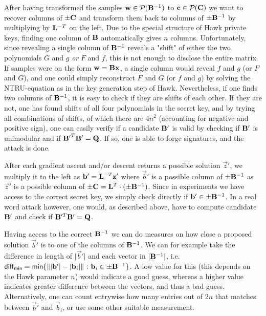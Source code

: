 After having transformed the samples $\mathbf{w} \in \mathcal{P}_{}(\mathbf{\mathbf{B}^{-1}})$ to $\mathbf{c} \in \mathcal{P}_{}(\mathbf{\mathbf{C}})$ we want to recover columns of $\pm \mathbf{C}$ and transform them back to columns of $\pm \mathbf{B}^{-1}$ by multiplying by $\mathbf{L}^{-T}$ on the left.
Due to the special structure of Hawk private keys, finding one column of $\mathbf{B}$ automatically gives $n$ columns.
Unfortunately, since revealing a single column of $ \mathbf{B}^{-1}$ reveals a "shift" of either the two polynomials $G$ and $ g$ \textit{or} $F$ and $f$,
this is not enough to disclose the entire matrix. If samples were on the form $\mathbf{w} = \mathbf{B} \mathbf{x}$, a single column would reveal $f$ and $g$ (or $F$ and $G$), and one could simply reconstruct $F$ and $G$ (or $f$ and $g$)
by solving the NTRU-equation as in the key generation step of Hawk.
Nevertheless, if one finds two columns of $\mathbf{B}^{-1}$, it is easy to check if they are shifts of each other. If they are not, one has found shifts of all four polynomials in the secret key, 
and by trying all combinations of shifts, of which there are $4 n^2$ (accounting for negative and positive sign), one can easily verify if a candidate $\mathbf{B'}$ is valid by 
checking if $\mathbf{B}'$ is unimodular and if $\mathbf{B'}^T \mathbf{B'} = \mathbf{Q}$. If so, one is able to forge signatures, and the attack is done.

After each gradient ascent and/or descent returns a possible solution $\vec{z}'$, 
we multiply it to the left as $\mathbf{b}' = \mathbf{L}^{-T} \mathbf{z}'$ where $\vec{b}'$ is a possible column of $\pm \mathbf{B}^{-1}$ as $\vec{z}'$ is a possible column of $\pm \mathbf{C} = \mathbf{L}^T \cdot (\pm \mathbf{B}^{-1})$.
Since in experiments we have access to the correct secret key, we simply check directly if $\mathbf{b}' \in \pm \mathbf{B}^{-1}$.
In a real word attack however, one would, as described above, have to compute candidate $\mathbf{B}'$ and check if $\mathbf{B}'^T\mathbf{B}' = \mathbf{Q}$.

Having access to the correct $\mathbf{B}^{-1}$ we can do measures on how close a proposed solution $\vec{b}'$ is to one of the columns of $\mathbf{B}^{-1}$.
We can for example take the difference in length of $\lvert \vec{b}' \rvert $ and each vector in $\lvert \mathbf{B}^{-1}\rvert$, i.e. 
$ \mathsf{diff_{min}} = \mathsf{min} \{\lVert \lvert \vec{b}' \rvert - \lvert \vec{b}_i \rvert \rVert \ \mathbf{:} \ \vec{b}_i \in \pm \mat{B}^{-1}\}$.
A low value for this (this depends on the Hawk parameter $n$) would indicate a good guess, whereas a higher value indicates greater difference between the vectors, and thus a bad guess.
Alternatively, one can count entrywise how many entries out of $2n$ that matches between $\vec{b}'$ and $\vec{b}_i$, or use some other suitable measurement.

